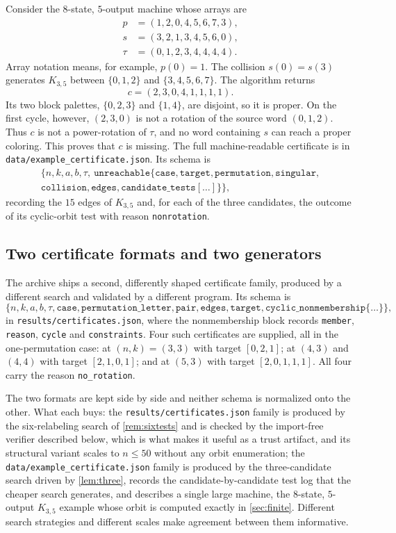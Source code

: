 \documentclass[11pt,a4paper]{article}
\numberwithin{equation}{section}
\theoremstyle{definition}
\theoremstyle{remark}
\begin{document}
Consider the $8$-state, $5$-output machine whose arrays are
\begin{align*}
 p&=(1,2,0,4,5,6,7,3),\\
 s&=(3,2,1,3,4,5,6,0),\\
 \tau&=(0,1,2,3,4,4,4,4).
\end{align*}
Array notation means, for example, $p(0)=1$. The collision $s(0)=s(3)$
generates $K_{3,5}$ between $\{0,1,2\}$ and $\{3,4,5,6,7\}$.
The algorithm returns
\[
 c=(2,3,0,4,1,1,1,1).
\]
Its two block palettes, $\{0,2,3\}$ and $\{1,4\}$, are disjoint, so it is
proper. On the first cycle, however, $(2,3,0)$ is not a rotation of the
source word $(0,1,2)$. Thus $c$ is not a power-rotation of $\tau$, and no word
containing $s$ can reach a proper coloring. This proves that $c$ is missing.
The full machine-readable certificate is in
\texttt{data/example\_certificate.json}. Its schema is
\begin{multline*}
 \{n,k,a,b,\tau,\ \texttt{unreachable}\{\texttt{case},\texttt{target},
 \texttt{permutation},\texttt{singular},\\
 \texttt{collision},\texttt{edges},\texttt{candidate\_tests}[\ldots]\}\},
\end{multline*}
recording the $15$ edges of $K_{3,5}$ and, for each of the three candidates,
the outcome of its cyclic-orbit test with reason \texttt{nonrotation}.

\subsection{Two certificate formats and two
generators}\label{sec:twocerts}

The archive ships a second, differently shaped certificate family, produced
by a different search and validated by a different program. Its schema is
\[
 \{n,k,a,b,\tau,\texttt{case},\texttt{permutation\_letter},\texttt{pair},
 \texttt{edges},\texttt{target},
 \texttt{cyclic\_nonmembership}\{\ldots\}\},
\]
in \texttt{results/certificates.json}, where the nonmembership block records
\texttt{member}, \texttt{reason}, \texttt{cycle} and \texttt{constraints}.
Four such certificates are supplied, all in the one-permutation case: at
$(n,k)=(3,3)$ with target $[0,2,1]$; at $(4,3)$ and $(4,4)$ with target
$[2,1,0,1]$; and at $(5,3)$ with target $[2,0,1,1,1]$. All four carry the
reason \texttt{no\_rotation}.

The two formats are kept side by side and neither schema is normalized onto
the other. What each buys: the \texttt{results/certificates.json} family is
produced by the six-relabeling search of \cref{rem:sixtests} and is checked
by the import-free verifier described below, which is what makes it useful
as a trust artifact, and its structural variant scales to $n\le50$ without
any orbit enumeration; the \texttt{data/example\_certificate.json} family is
produced by the three-candidate search driven by \cref{lem:three}, records
the candidate-by-candidate test log that the cheaper search generates, and
describes a single large machine, the $8$-state, $5$-output $K_{3,5}$
example whose orbit is computed exactly in \cref{sec:finite}. Different
search strategies and different scales make agreement between them
informative.
\end{document}
